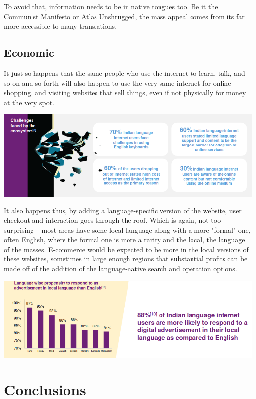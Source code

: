 \documentclass[11pt]{article}
\begin{document}
To avoid that, information needs to be in native tongues too. Be it the
Communist Manifesto or Atlas Unshrugged, the mass appeal comes from its far more
accessible to many translations.

\subsection{Economic}

It just so happens that the same people who use the internet to learn, talk, and
so on and so forth will also happen to use the very same internet for online
shopping, and visiting websites that sell things, even if not physically for
money at the very spot.

\includegraphics[width=\textwidth]{indlang}

It also happens thus, by adding a language-specific version of the website, user
checkout and interaction goes through the roof. Which is again, not too
surprising -- most areas have some local language along with a more "formal"
one, often English, where the formal one is more a rarity and the local, the
language of the masses. E-commerce would be expected to be more in the local
versions of these websites, sometimes in large enough regions that substantial
profits can be made off of the addition of the language-native search and
operation options.

\includegraphics[width=\textwidth]{indad}

\section{Conclusions}
\end{document}
